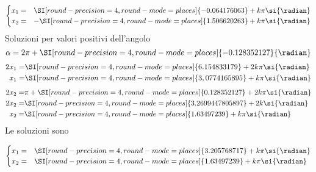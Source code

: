 \begin{exercise}
 \[\begin{cases}
 x_1=&\SI[round-precision=\lungarrotandamento,round-mode=places]{-0.064176063}+k\pi \si{\radian}\\
 x_2=&-\SI[round-precision=\lungarrotandamento,round-mode=places]{1.506620263}+k\pi \si{\radian}\\
 \end{cases}\]
 Soluzioni per valori positivi dell'angolo
 \[\alpha=2\pi+ \SI[round-precision=\lungarrotandamento,round-mode=places]{-0.128352127}{\radian}\]
 \begin{align*}
 2x_1=&\SI[round-precision=\lungarrotandamento,round-mode=places]{6.154833179}+2k\pi \si{\radian}\\
 x_1=&\SI[round-precision=\lungarrotandamento,round-mode=places]{3,0774165895}+k\pi \si{\radian}\\
 \end{align*}
 \begin{align*}
 2x_2=&\pi+\SI[round-precision=\lungarrotandamento,round-mode=places]{0.128352127}+2k\pi \si{\radian}\\
 2x_2=&\SI[round-precision=\lungarrotandamento,round-mode=places]{3.2699447805897}+2k \si{\radian}\\
 x_2=&\SI[round-precision=\lungarrotandamento,round-mode=places]{1.63497239}+k\pi \si{\radian}\\
 \end{align*}
 Le soluzioni sono
 
 \[\begin{cases}
 x_1=&\SI[round-precision=\lungarrotandamento,round-mode=places]{3.205768717}+k\pi \si{\radian}\\
 x_2=&\SI[round-precision=\lungarrotandamento,round-mode=places]{1.63497239}+k\pi \si{\radian}\\
 \end{cases}\]
 
 \end{exercise}
 

